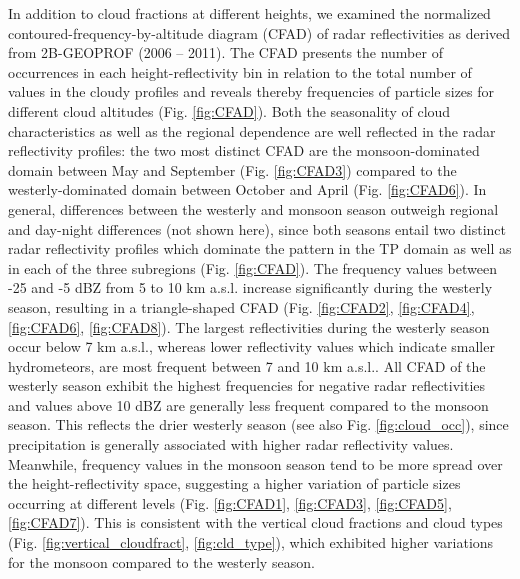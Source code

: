 \documentclass[alpha-refs]{wiley-article}
\begin{document}
In addition to cloud fractions at different heights, we examined the normalized contoured-frequency-by-altitude diagram (CFAD) of radar reflectivities as derived from 2B-GEOPROF (2006 -- 2011). The CFAD presents the number of occurrences in each height-reflectivity bin in relation to the total number of values in the cloudy profiles \citep{CFAD1995} and reveals thereby frequencies of particle sizes for different cloud altitudes (Fig. \ref{fig:CFAD}). Both the seasonality of cloud characteristics as well as the regional dependence are well reflected in the radar reflectivity profiles: the two most distinct CFAD are the monsoon-dominated domain between May and September (Fig. \ref{fig:CFAD3}) compared to the westerly-dominated domain between October and April (Fig. \ref{fig:CFAD6}). In general, differences between the westerly and monsoon season outweigh regional and day-night differences (not shown here), since both seasons entail two distinct radar reflectivity profiles which dominate the pattern in the TP domain as well as in each of the three subregions (Fig. \ref{fig:CFAD}). The frequency values between -25 and -5 dBZ from 5 to 10 km a.s.l. increase significantly during the westerly season, resulting in a triangle-shaped CFAD (Fig. \ref{fig:CFAD2}, \ref{fig:CFAD4}, \ref{fig:CFAD6}, \ref{fig:CFAD8}). The largest reflectivities during the westerly season occur below 7 km a.s.l., whereas lower reflectivity values which indicate smaller hydrometeors, are most frequent between 7 and 10 km a.s.l.. All CFAD of the westerly season exhibit the highest frequencies for negative radar reflectivities and values above 10 dBZ are generally less frequent compared to the monsoon season. This reflects the drier westerly season (see also Fig. \ref{fig:cloud_occ}), since precipitation is generally associated with higher radar reflectivity values. Meanwhile, frequency values in the monsoon season tend to be more spread over the height-reflectivity space, suggesting a higher variation of particle sizes occurring at different levels (Fig. \ref{fig:CFAD1}, \ref{fig:CFAD3}, \ref{fig:CFAD5}, \ref{fig:CFAD7}). This is consistent with the vertical cloud fractions and cloud types (Fig. \ref{fig:vertical_cloudfract}, \ref{fig:cld_type}), which exhibited higher variations for the monsoon compared to the westerly season. 
\end{document}
